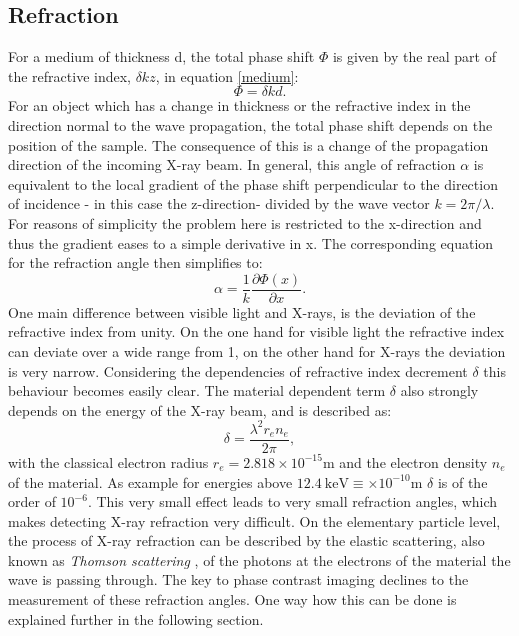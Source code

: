 \subsection{Refraction}\label{subsec:ref}
For a medium of thickness d, the total phase shift $\Phi$ is given by the real part of the refractive index, $\delta kz$, in equation \ref{medium}:
\begin{equation}
\Phi = \delta kd.
\end{equation}
For an object which has a change in thickness or the refractive index in the direction normal to the wave propagation, the total phase shift depends on the position of the sample. The consequence of this is a change of the propagation direction of the incoming X-ray beam. In general, this angle of refraction $\alpha$ is equivalent to the local gradient of the phase shift perpendicular to the direction of incidence - in this case the z-direction- divided by the wave vector $k = 2\pi /\lambda$. For reasons of simplicity the problem here is restricted to the x-direction and thus the gradient eases to a simple derivative in x. The corresponding equation for the refraction angle then simplifies to:
\begin{equation}\label{refrangle}
\alpha = \frac{1}{k}\frac{\partial\Phi(x)}{\partial x}.
\end{equation} 
One main difference between visible light and X-rays, is the deviation of the refractive index from unity. On the one hand for visible light the refractive index can deviate over a wide range from 1, on the other hand for X-rays the deviation is very narrow. Considering the dependencies of refractive index decrement $\delta$ this behaviour becomes easily clear. The material dependent term $\delta$ also strongly depends on the energy of the X-ray beam, and is described as:
\begin{equation}
\delta= \frac{\lambda^{2}r_{e}n_{e}}{2\pi},
\end{equation}
with the classical electron radius $r_{e} = 2.818 \times 10^{-15}$m and the electron density $n_{e}$ of the material. As example for energies above $12.4\ \text{keV} \equiv  \times 10^{-10}$m $\delta $ is of the order of $ 10^{-6}$. This very small effect leads to very small refraction angles, which makes detecting X-ray refraction very difficult. On the elementary particle level, the process of X-ray refraction can be described by the elastic scattering, also known as \textit{Thomson scattering} \citep{Als-nielsen}, of the photons at the electrons of the material the wave is passing through. The key to phase contrast imaging declines to the measurement of these refraction angles. One way how this can be done is explained further in the following section.      
